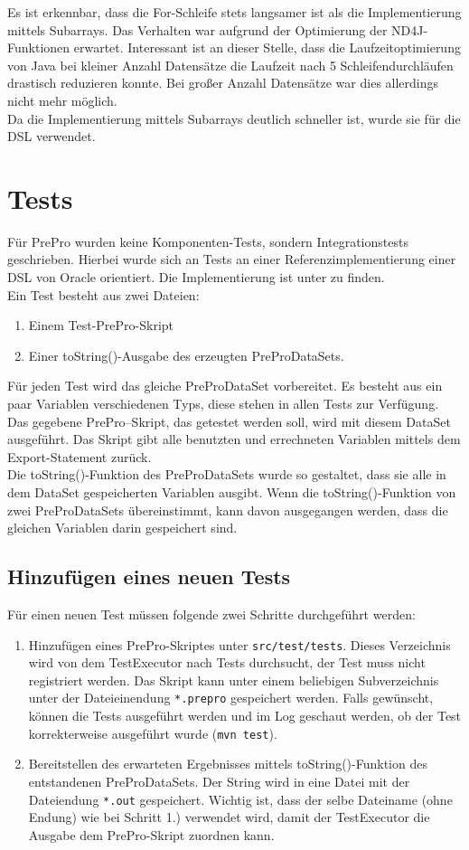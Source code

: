\noindent
Es ist erkennbar, dass die For-Schleife stets langsamer ist als die Implementierung mittels Subarrays.
Das Verhalten war aufgrund der Optimierung der ND4J-Funktionen erwartet.
Interessant ist an dieser Stelle, dass die Laufzeitoptimierung von Java bei kleiner Anzahl Datensätze die Laufzeit nach 5 Schleifendurchläufen drastisch reduzieren konnte.
Bei großer Anzahl Datensätze war dies allerdings nicht mehr möglich.\\
Da die Implementierung mittels Subarrays deutlich schneller ist, wurde sie für die \ac{DSL} verwendet.

\section{Tests}
Für PrePro wurden keine Komponenten-Tests, sondern Integrationstests geschrieben.
Hierbei wurde sich an Tests an einer Referenzimplementierung einer \ac{DSL} von Oracle orientiert.
Die Implementierung ist unter \cite{simpleLanguage} zu finden.\\
Ein Test besteht aus zwei Dateien:
\begin{enumerate}
\item Einem Test-PrePro-Skript
\item Einer toString()-Ausgabe des erzeugten PreProDataSets.
\end{enumerate}
Für jeden Test wird das gleiche PreProDataSet vorbereitet.
Es besteht aus ein paar Variablen verschiedenen Typs, diese stehen in allen Tests zur Verfügung.
Das gegebene PrePro--Skript, das getestet werden soll, wird mit diesem DataSet ausgeführt.
Das Skript gibt alle benutzten und errechneten Variablen mittels dem Export-Statement zurück.\\
Die toString()-Funktion des PreProDataSets wurde so gestaltet, dass sie alle in dem DataSet gespeicherten Variablen ausgibt.
Wenn die toString()-Funktion von zwei PreProDataSets übereinstimmt, kann davon ausgegangen werden, dass die gleichen Variablen darin gespeichert sind.

\subsection{Hinzufügen eines neuen Tests}
Für einen neuen Test müssen folgende zwei Schritte durchgeführt werden:
\begin{enumerate}
\item Hinzufügen eines PrePro-Skriptes unter \texttt{src/test/tests}.
Dieses Verzeichnis wird von dem TestExecutor nach Tests durchsucht, der Test muss nicht registriert werden.
Das Skript kann unter einem beliebigen Subverzeichnis unter der Dateieinendung \texttt{*.prepro} gespeichert werden.
Falls gewünscht, können die Tests ausgeführt werden und im Log geschaut werden, ob der Test korrekterweise ausgeführt wurde (\texttt{mvn test}).
\item Bereitstellen des erwarteten Ergebnisses mittels toString()-Funktion des entstandenen PreProDataSets.
Der String wird in eine Datei mit der Dateiendung \texttt{*.out} gespeichert.
Wichtig ist, dass der selbe Dateiname (ohne Endung) wie bei Schritt 1.) verwendet wird, damit der TestExecutor die Ausgabe dem PrePro-Skript zuordnen kann.
\end{enumerate}

\endinput
